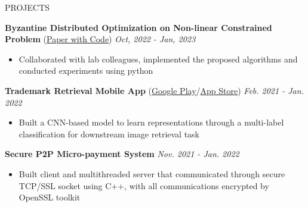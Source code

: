 \documentclass{resume} %
\begin{document}
\begin{rSection}{PROJECTS}
\vspace{-1.25em}

\item {\bf Byzantine Distributed Optimization on Non-linear Constrained Problem} (\href{https://github.com/slimon110/2022_Fault_Tolerance/blob/master/FT-Report/FT-Report.pdf}{Paper with Code})  \hfill \textit{Oct, 2022 - Jan, 2023}
\begin{itemize}
    \itemsep -3pt
    \item Collaborated with lab colleagues, implemented the proposed algorithms and conducted experiments using python
\end{itemize}


\item \textbf{Trademark Retrieval Mobile App} (\href{https://play.google.com/store/apps/details?id=meow.logoshot&hl=zh_TW&gl=TW&pli=1}{Google Play}/\href{https://apps.apple.com/tw/app/logo-shot/id1611756574}{App Store}) \hfill \textit{Feb. 2021 - Jan. 2022}
\begin{itemize}
    \itemsep -3pt
    \item  Built a CNN-based model to learn representations through a multi-label classification for downstream image retrieval task 
\end{itemize}

\item \textbf{Secure P2P Micro-payment System} \hfill \textit{Nov. 2021 - Jan. 2022} 
\begin{itemize}
    \itemsep -3pt
    \item Built client and multithreaded server that communicated through secure TCP/SSL socket using C++, with all communications encrypted by OpenSSL toolkit
\end{itemize}


\end{rSection}
\end{document}
